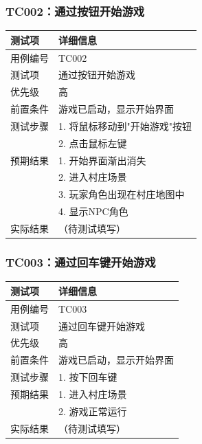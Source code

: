 \documentclass[a4paper,12pt]{article}
\begin{document}
\subsubsection{TC002：通过按钮开始游戏}
\begin{table}[h]
\centering
\begin{tabular}{ll}
\toprule
测试项 & 详细信息 \\
\midrule
用例编号 & TC002 \\
测试项 & 通过按钮开始游戏 \\
优先级 & 高 \\
前置条件 & 游戏已启动，显示开始界面 \\
测试步骤 & 1. 将鼠标移动到"开始游戏"按钮 \\
 & 2. 点击鼠标左键 \\
预期结果 & 1. 开始界面渐出消失 \\
 & 2. 进入村庄场景 \\
 & 3. 玩家角色出现在村庄地图中 \\
 & 4. 显示NPC角色 \\
实际结果 & （待测试填写） \\
\bottomrule
\end{tabular}
\end{table}

\subsubsection{TC003：通过回车键开始游戏}
\begin{table}[h]
\centering
\begin{tabular}{ll}
\toprule
测试项 & 详细信息 \\
\midrule
用例编号 & TC003 \\
测试项 & 通过回车键开始游戏 \\
优先级 & 高 \\
前置条件 & 游戏已启动，显示开始界面 \\
测试步骤 & 1. 按下回车键 \\
预期结果 & 1. 进入村庄场景 \\
 & 2. 游戏正常运行 \\
实际结果 & （待测试填写） \\
\bottomrule
\end{tabular}
\end{table}
\end{document}
